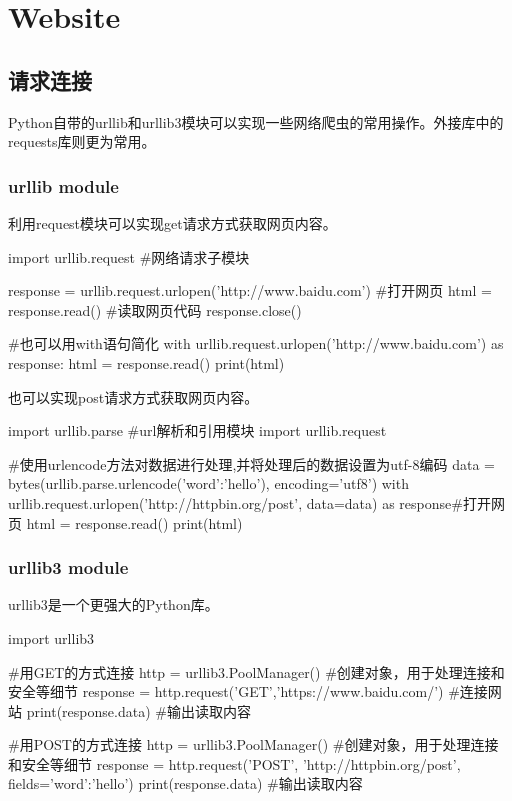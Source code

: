 \section{Website}

  \subsection{请求连接}
    Python自带的urllib和urllib3模块可以实现一些网络爬虫的常用操作。外接库中的requests库则更为常用。
    \subsubsection{urllib module}
      利用request模块可以实现get请求方式获取网页内容。
      \begin{codeblock}[language=python, caption={Fetch web content using GET method}]
        import urllib.request #网络请求子模块

        response = urllib.request.urlopen('http://www.baidu.com') #打开网页
        html = response.read() #读取网页代码
        response.close()

        #也可以用with语句简化
        with urllib.request.urlopen('http://www.baidu.com') as response:
            html = response.read()
        print(html)
      \end{codeblock}

      也可以实现post请求方式获取网页内容。
      \begin{codeblock}[language=python, caption={Fetch web content using POST method}]
        import urllib.parse #url解析和引用模块
        import urllib.request

        #使用urlencode方法对数据进行处理,并将处理后的数据设置为utf-8编码
        data = bytes(urllib.parse.urlencode({'word':'hello'}), encoding='utf8')
        with urllib.request.urlopen('http://httpbin.org/post', data=data) as response#打开网页
            html = response.read()
        print(html)
      \end{codeblock}

    \subsubsection{urllib3 module}
      urllib3是一个更强大的Python库。
      \begin{codeblock}[language=python, caption={urllib3 module}]
        import urllib3

        #用GET的方式连接
        http = urllib3.PoolManager() #创建对象，用于处理连接和安全等细节
        response = http.request('GET','https://www.baidu.com/') #连接网站
        print(response.data) #输出读取内容

        #用POST的方式连接
        http = urllib3.PoolManager() #创建对象，用于处理连接和安全等细节
        response = http.request('POST', 'http://httpbin.org/post', fields={'word':'hello'})
        print(response.data) #输出读取内容
      \end{codeblock}

